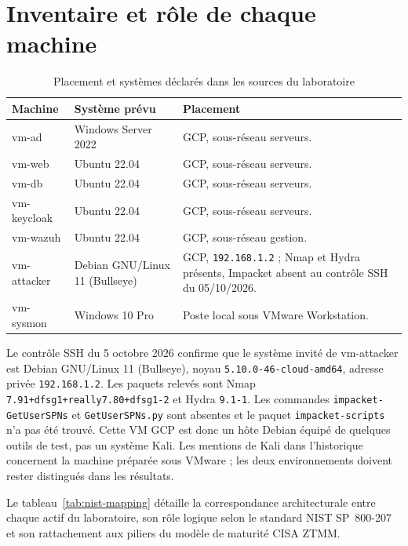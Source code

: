 \documentclass[a4paper,12pt]{report}
\begin{document}
\section{Inventaire et rôle de chaque machine}
\begin{table}[H]\centering\small
\caption{Placement et systèmes déclarés dans les sources du laboratoire}
\begin{tabularx}{\textwidth}{p{2.8cm}p{3.5cm}Y}\toprule
\textbf{Machine} & \textbf{Système prévu} & \textbf{Placement}\\\midrule
vm-ad & Windows Server 2022 & GCP, sous-réseau serveurs.\\
vm-web & Ubuntu 22.04 & GCP, sous-réseau serveurs.\\
vm-db & Ubuntu 22.04 & GCP, sous-réseau serveurs.\\
vm-keycloak & Ubuntu 22.04 & GCP, sous-réseau serveurs.\\
vm-wazuh & Ubuntu 22.04 & GCP, sous-réseau gestion.\\
vm-attacker & Debian GNU/Linux 11 (Bullseye) & GCP, \texttt{192.168.1.2} ; Nmap et Hydra présents, Impacket absent au contrôle SSH du 05/10/2026.\\
vm-sysmon & Windows 10 Pro & Poste local sous VMware Workstation.\\\bottomrule
\end{tabularx}\end{table}
Le contrôle SSH du 5 octobre 2026 confirme que le système invité de vm-attacker est Debian GNU/Linux 11 (Bullseye), noyau \texttt{5.10.0-46-cloud-amd64}, adresse privée \texttt{192.168.1.2}. Les paquets relevés sont Nmap \texttt{7.91+dfsg1+really7.80+dfsg1-2} et Hydra \texttt{9.1-1}. Les commandes \texttt{impacket-GetUserSPNs} et \texttt{GetUserSPNs.py} sont absentes et le paquet \texttt{impacket-scripts} n'a pas été trouvé. Cette VM GCP est donc un hôte Debian équipé de quelques outils de test, pas un système Kali. Les mentions de Kali dans l'historique concernent la machine préparée sous VMware ; les deux environnements doivent rester distingués dans les résultats.

Le tableau~\ref{tab:nist-mapping} détaille la correspondance architecturale entre chaque actif du laboratoire, son rôle logique selon le standard NIST SP~800-207 et son rattachement aux piliers du modèle de maturité CISA ZTMM.
\end{document}
